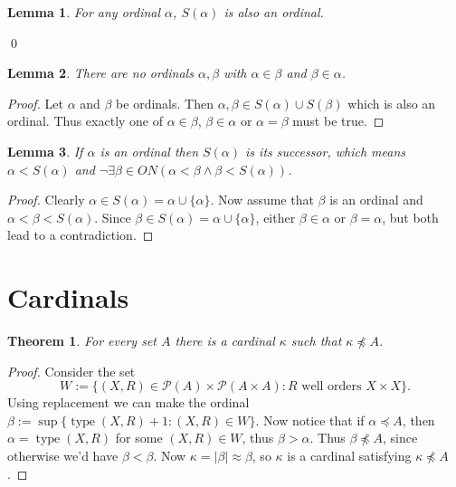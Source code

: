 \documentclass{report}
\newtheorem{theorem}{Theorem}[section]
\newtheorem{lemma}{Lemma}[section]
\theoremstyle{definition}
\theoremstyle{remark}
\newcommand{\set}[1]{\{#1\}}
\newcommand{\powerset}[1]{\mathcal{P}\left (#1\right)}
\DeclareMathOperator{\type}{type}
\begin{document}
\begin{lemma}
    For any ordinal $\alpha$, $S(\alpha)$ is also an ordinal.
\end{lemma} \qed

\begin{lemma}
    There are no ordinals $\alpha, \beta$ with $\alpha \in \beta$ and $\beta \in \alpha$.
\end{lemma}

\begin{proof}
    Let $\alpha$ and $\beta$ be ordinals. Then $\alpha, \beta \in S(\alpha) \cup S(\beta)$ which is also an ordinal. Thus exactly one of $\alpha \in \beta$, $\beta \in \alpha$ or $\alpha = \beta$ must be true.
\end{proof}

\begin{lemma}
    If $\alpha$ is an ordinal then $S(\alpha)$ is its successor, which means $\alpha < S(\alpha)$ and $\neg \exists \beta \in ON (\alpha < \beta \land \beta < S(\alpha))$.
\end{lemma}

\begin{proof}
    Clearly $\alpha \in S(\alpha) = \alpha \cup \set{\alpha}$. Now assume that $\beta$ is an ordinal and $\alpha < \beta < S(\alpha)$. Since $\beta \in S(\alpha) = \alpha \cup \set{\alpha}$, either $\beta \in \alpha$ or $\beta = \alpha$, but both lead to a contradiction.
\end{proof}

\setcounter{section}{10}
\section{Cardinals}

\begin{theorem}
    For every set $A$ there is a cardinal $\kappa$ such that $\kappa \npreceq A$.
\end{theorem}

\begin{proof}
    Consider the set $$W := \set{(X, R) \in \powerset{A} \times \powerset{A \times A} : \text{$R$ well orders $X \times X$}}.$$ Using replacement we can make the ordinal $\beta := \sup\set{\type(X, R) + 1 : (X, R) \in W}$. Now notice that if $\alpha \preceq A$, then $\alpha = \type(X, R)$ for some $(X, R) \in W$, thus $\beta > \alpha$. Thus $\beta \npreceq A$, since otherwise we'd have $\beta < \beta$. Now $\kappa = |\beta| \approx \beta$, so $\kappa$ is a cardinal satisfying $\kappa \npreceq A$.
\end{proof}
\end{document}
